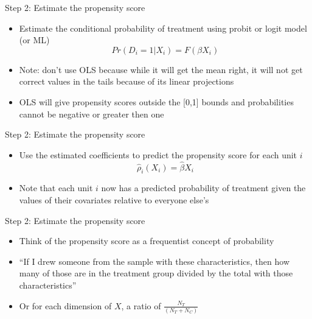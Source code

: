\documentclass{beamer}
\begin{document}
\begin{frame}{Step 2: Estimate the propensity score}

		\begin{itemize}
		\item Estimate the conditional probability of treatment using probit or logit model (or ML) $$Pr(D_i=1|X_i) = F(\beta X_i)$$
			\item Note: don't use OLS because while it will get the mean right, it will not get correct values in the tails because of its linear projections
			\item OLS will give propensity scores outside the [0,1] bounds and probabilities cannot be negative or greater then one
		\end{itemize}
\end{frame}

\begin{frame}{Step 2: Estimate the propensity score}

		\begin{itemize}
		\item Use the estimated coefficients to predict the propensity score for each unit $i$$$\widehat{\rho}_i(X_i) = \widehat{\beta} X_i$$
		\item Note that each unit $i$ now has a predicted probability of treatment given the values of their covariates relative to everyone else's 
		\end{itemize}
\end{frame}



\begin{frame}{Step 2: Estimate the propensity score}

\begin{itemize}
\item Think of the propensity score as a frequentist concept of probability
\item ``If I drew someone from the sample with these characteristics, then how many of those are in the treatment group divided by the total with those characteristics'' 
\item Or for each dimension of $X$, a ratio of $\frac{N_T}{(N_T + N_C)}$

\end{itemize}

\end{frame}
\end{document}
